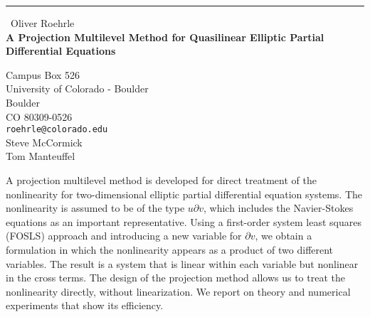 \documentclass{report}
\begin{document}
\begin{center}
\rule{6in}{1pt} \
{\large Oliver Roehrle \\
{\bf A Projection Multilevel Method for Quasilinear Elliptic Partial Differential Equations}}

Campus Box 526 \\ University of Colorado - Boulder \\ Boulder \\ CO 80309-0526
\\
{\tt roehrle@colorado.edu}\\
Steve McCormick\\
Tom Manteuffel\end{center}

A projection multilevel method is developed for direct treatment of the
nonlinearity for two-dimensional elliptic partial differential equation
systems. The nonlinearity is assumed to be of the type \(u \partial v\),
which includes the Navier-Stokes equations as an important
representative. Using a first-order system least squares (FOSLS) approach
and introducing a new variable for \( \partial v \), we obtain a
formulation in which the nonlinearity appears as a product of two
different variables. The result is a system that is linear within each
variable but nonlinear in the cross terms. The design of the projection
method allows us to treat the nonlinearity directly, without
linearization. We report on theory and numerical experiments that show
its efficiency.
\end{document}
